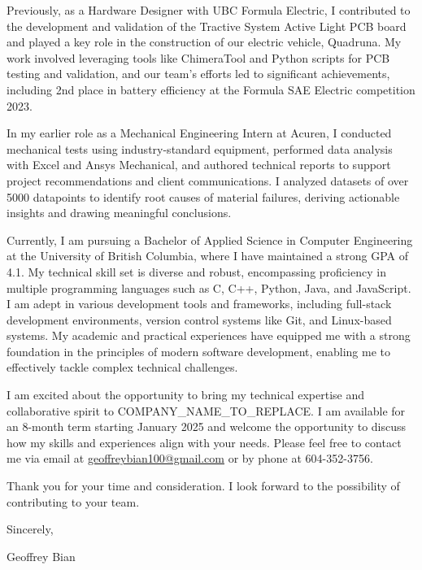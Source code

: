 \documentclass[letterpaper,11pt]{article}
\newcommand{\companyname}{COMPANY_NAME_TO_REPLACE}
\begin{document}
Previously, as a Hardware Designer with UBC Formula Electric, I contributed to the development and validation of the Tractive System Active Light PCB board and played a key role in the construction of our electric vehicle, Quadruna. My work involved leveraging tools like ChimeraTool and Python scripts for PCB testing and validation, and our team's efforts led to significant achievements, including 2nd place in battery efficiency at the Formula SAE Electric competition 2023.

\vspace{10pt}

In my earlier role as a Mechanical Engineering Intern at Acuren, I conducted mechanical tests using industry-standard equipment, performed data analysis with Excel and Ansys Mechanical, and authored technical reports to support project recommendations and client communications. I analyzed datasets of over 5000 datapoints to identify root causes of material failures, deriving actionable insights and drawing meaningful conclusions.

\vspace{10pt}

Currently, I am pursuing a Bachelor of Applied Science in Computer Engineering at the University of British Columbia, where I have maintained a strong GPA of 4.1. My technical skill set is diverse and robust, encompassing proficiency in multiple programming languages such as C, C++, Python, Java, and JavaScript. I am adept in various development tools and frameworks, including full-stack development environments, version control systems like Git, and Linux-based systems. My academic and practical experiences have equipped me with a strong foundation in the principles of modern software development, enabling me to effectively tackle complex technical challenges.

\vspace{10pt}

I am excited about the opportunity to bring my technical expertise and collaborative spirit to \companyname. I am available for an 8-month term starting January 2025 and welcome the opportunity to discuss how my skills and experiences align with your needs. Please feel free to contact me via email at \href{mailto:geoffreybian100@gmail.com}{geoffreybian100@gmail.com} or by phone at 604-352-3756.

\vspace{10pt}

Thank you for your time and consideration. I look forward to the possibility of contributing to your team.

\vspace{15pt}

Sincerely,

\vspace{15pt}

Geoffrey Bian
\end{document}
